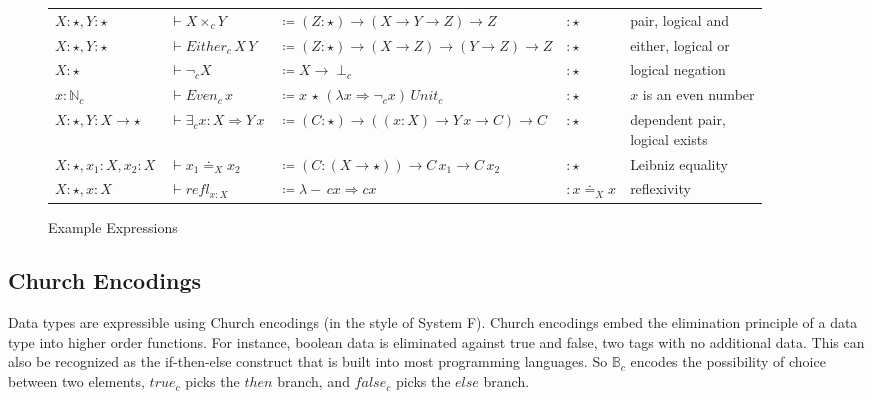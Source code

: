 \begin{sidewaysfigure}
\begin{tabular}{lllll}
$X:\star,Y:\star$ & $\vdash X\times_{c}Y$ & $\coloneqq\left(Z:\star\right)\rightarrow(X\rightarrow Y\rightarrow Z)\rightarrow Z$ & $:\star$ & pair, logical and\tabularnewline
$X:\star,Y:\star$ & $\vdash Either_{c}\,X\,Y$ & $\coloneqq\left(Z:\star\right)\rightarrow(X\rightarrow Z)\rightarrow(Y\rightarrow Z)\rightarrow Z$ & $:\star$ & either, logical or\tabularnewline
$X:\star$ & $\vdash\lnot_{c}X$ & $\coloneqq X\rightarrow\perp_{c}$ & $:\star$ & logical negation\tabularnewline
$x:\mathbb{N}_{c}$ & $\vdash Even_{c}\,x$ & $\coloneqq x\,\star\,\left(\lambda x\Rightarrow\lnot_{c}x\right)\,Unit_{c}$ & $:\star$ & $x$ is an even number\tabularnewline
$X:\star,Y:X\rightarrow\star$ & $\vdash\exists_{c}x:X\Rightarrow Y\,x$ & $\coloneqq\left(C:\star\right)\rightarrow\left((x:X)\rightarrow Y\,x\rightarrow C\right)\rightarrow C$ & $:\star$ & \makecell[l]{dependent pair,\\ logical exists}\tabularnewline
$X:\star,x_{1}:X,x_{2}:X$ & $\vdash x_{1}\doteq_{X}x_{2}$ & $\coloneqq\left(C:\left(X\rightarrow\star\right)\right)\rightarrow C\,x_{1}\rightarrow C\,x_{2}$ & $:\star$ & Leibniz equality\tabularnewline
$X:\star,x:X$ & $\vdash refl_{x:X}$ & $\coloneqq\lambda-\,cx\Rightarrow cx$ & $:x\doteq_{X}x$ & reflexivity\tabularnewline
\end{tabular}


\caption{Example \SLang{} Expressions}
\label{fig:surface-examples}
\end{sidewaysfigure}

\subsection{Church Encodings}

Data types are expressible using Church encodings (in the style of System F).
Church encodings embed the elimination principle of a data type into higher order functions.
For instance, boolean data is eliminated against true and false, two tags with no additional data.
This can also be recognized as the if-then-else construct that is built into most programming languages.
So $\mathbb{B}_{c}$ encodes the possibility of choice between two elements, $true_{c}$ picks the $then$ branch, and $false_{c}$ picks the $else$ branch.

